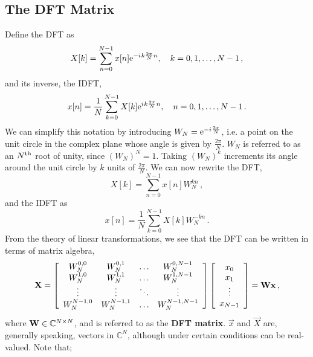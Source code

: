 \subsection{The DFT Matrix}
%
Define the DFT as
%
\begin{equation}
  X[k] = \sum_{n=0}^{N-1}x[n]\mathrm{e}^{-{i\mkern1mu} k\frac{2\pi}{N}n},
  \quad k = 0,1,\hdots, N-1 \,,
\end{equation}
%
and its inverse, the IDFT,
%
\begin{equation}
  x[n] = \frac{1}{N}\sum_{k=0}^{N-1}X[k]\mathrm{e}^{{i\mkern1mu} k\frac{2\pi}{N}n},
  \quad n = 0,1,\hdots, N-1 \,.
\end{equation}
%
We can simplify this notation by introducing
$W_N=\mathrm{e}^{-{i\mkern1mu}\frac{2\pi}{N}}$, i.e. a point on the unit circle in the
complex plane whose angle is given by $\frac{2\pi}{N}$. $W_N$ is referred
to as an $N^\mathrm{th}\mkern1mu$ root of unity, since $(W_N)^N = 1$.
Taking $(W_N)^k$ increments its angle around the unit circle by $k$
units of $\frac{2\pi}{N}$. We can now rewrite the DFT,
%
\begin{equation}
  X[k] = \sum_{n=0}^{N-1}x[n]W_N^{kn} \,,
\end{equation}
%
and the IDFT as
%
\begin{equation}
  x[n] = \frac{1}{N}\sum_{k=0}^{N-1}X[k]W_N^{-kn} \,.
\end{equation}
%
From the theory of linear transformations, we see that the DFT can be
written in terms of matrix algebra,
%
\begin{displaymath}
  \mathbf{X}
  =
  \left[\begin{array}{cccc}
      W_N^{0,0} & W_N^{0,1} & \hdots & W_N^{0,N-1} \\
      W_N^{1,0} & W_N^{1,1} & \hdots & W_N^{1,N-1} \\
      \vdots & \vdots & \ddots & \vdots \\
      W_N^{N-1,0} & W_N^{N-1,1} & \hdots & W_N^{N-1,N-1}
  \end{array}\right]
  \left[\begin{array}{c}
      x_0 \\ x_1 \\ \vdots \\ x_{N-1}
  \end{array}\right]
  = \mathbf{W}\mathbf{x} \,,
\end{displaymath}
%
where $\mathbf{W}\in\mathbb{C}^{N\times N}$, and is referred to as the
\textbf{DFT matrix}. $\vec{x}$ and $\vec{X}$ are,
generally speaking, vectors in $\mathbb{C}^N$, although under certain conditions
can be real-valued. Note that;
